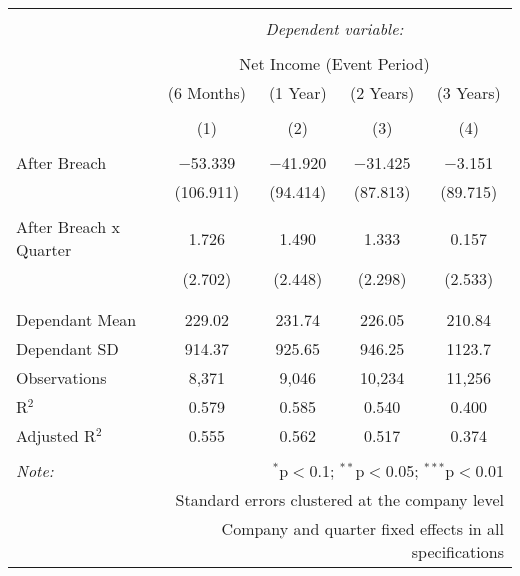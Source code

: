 
\begin{table}[!htbp] \centering 
  \caption{} 
  \label{} 
\begin{tabular}{@{\extracolsep{5pt}}lcccc} 
\\[-1.8ex]\hline 
\hline \\[-1.8ex] 
 & \multicolumn{4}{c}{\textit{Dependent variable:}} \\ 
\cline{2-5} 
\\[-1.8ex] & \multicolumn{4}{c}{Net Income (Event Period)} \\ 
 & (6 Months) & (1 Year) & (2 Years) & (3 Years) \\ 
\\[-1.8ex] & (1) & (2) & (3) & (4)\\ 
\hline \\[-1.8ex] 
 After Breach & $-$53.339 & $-$41.920 & $-$31.425 & $-$3.151 \\ 
  & (106.911) & (94.414) & (87.813) & (89.715) \\ 
  & & & & \\ 
 After Breach x Quarter & 1.726 & 1.490 & 1.333 & 0.157 \\ 
  & (2.702) & (2.448) & (2.298) & (2.533) \\ 
  & & & & \\ 
\hline \\[-1.8ex] 
Dependant Mean & 229.02 & 231.74 & 226.05 & 210.84 \\ 
Dependant SD & 914.37 & 925.65 & 946.25 & 1123.7 \\ 
Observations & 8,371 & 9,046 & 10,234 & 11,256 \\ 
R$^{2}$ & 0.579 & 0.585 & 0.540 & 0.400 \\ 
Adjusted R$^{2}$ & 0.555 & 0.562 & 0.517 & 0.374 \\ 
\hline 
\hline \\[-1.8ex] 
\textit{Note:}  & \multicolumn{4}{r}{$^{*}$p$<$0.1; $^{**}$p$<$0.05; $^{***}$p$<$0.01} \\ 
 & \multicolumn{4}{r}{Standard errors clustered at the company level} \\ 
 & \multicolumn{4}{r}{Company and quarter fixed effects in all specifications} \\ 
\end{tabular} 
\end{table} 
